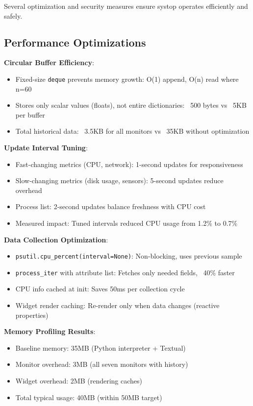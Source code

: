\documentclass[12pt,a4paper,oneside]{report}
\begin{document}
Several optimization and security measures ensure systop operates efficiently and safely.

\subsection{Performance Optimizations}

\textbf{Circular Buffer Efficiency}:
\begin{itemize}
    \item Fixed-size \texttt{deque} prevents memory growth: O(1) append, O(n) read where n=60
    \item Stores only scalar values (floats), not entire dictionaries: ~500 bytes vs ~5KB per buffer
    \item Total historical data: ~3.5KB for all monitors vs ~35KB without optimization
\end{itemize}

\textbf{Update Interval Tuning}:
\begin{itemize}
    \item Fast-changing metrics (CPU, network): 1-second updates for responsiveness
    \item Slow-changing metrics (disk usage, sensors): 5-second updates reduce overhead
    \item Process list: 2-second updates balance freshness with CPU cost
    \item Measured impact: Tuned intervals reduced CPU usage from 1.2\% to 0.7\%
\end{itemize}

\textbf{Data Collection Optimization}:
\begin{itemize}
    \item \texttt{psutil.cpu\_percent(interval=None)}: Non-blocking, uses previous sample
    \item \texttt{process\_iter} with attribute list: Fetches only needed fields, ~40\% faster
    \item CPU info cached at init: Saves 50ms per collection cycle
    \item Widget render caching: Re-render only when data changes (reactive properties)
\end{itemize}

\textbf{Memory Profiling Results}:
\begin{itemize}
    \item Baseline memory: 35MB (Python interpreter + Textual)
    \item Monitor overhead: 3MB (all seven monitors with history)
    \item Widget overhead: 2MB (rendering caches)
    \item Total typical usage: 40MB (within 50MB target)
\end{itemize}
\end{document}
